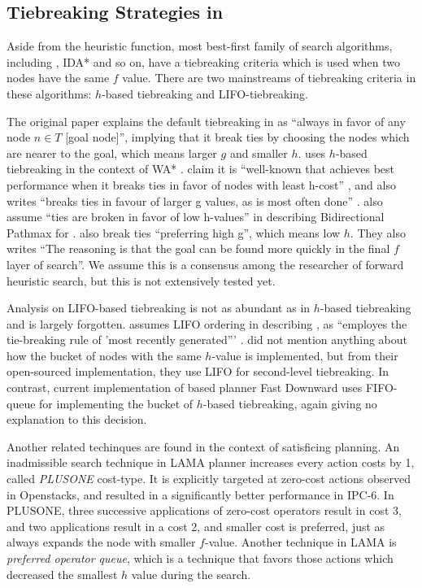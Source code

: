 \subsection{Tiebreaking Strategies in \astar}

Aside from the heuristic function, most best-first family of search
algorithms, including \astar, IDA* and so on, have a tiebreaking criteria which is used
when two nodes have the same $f$ value.
There are two mainstreams of tiebreaking criteria in these algorithms:
$h$-based tiebreaking and LIFO-tiebreaking.

The original \astar paper \cite{hart1968formal} explains the default
tiebreaking in \astar as ``always in favor of any node $n \in T$ [goal
node]'', implying that it break ties by choosing the nodes which are
nearer to the goal, which means larger $g$ and smaller $h$.
\citeauthor{Korf1985depth} uses $h$-based tiebreaking in the context of WA*
\cite{korf1993linear}.  \citeauthor{hansen2007anytime} claim it is
``well-known that \astar achieves best performance when it breaks ties
in favor of nodes with least h-cost'' \cite{hansen2007anytime}, and
\citeauthor{holte2010common} also writes ``\astar breaks ties in favour
of larger g values, as is most often done'' \cite{holte2010common}.
\citeauthor{felner2011inconsistent} also assume ``ties are broken in
favor of low h-values'' in describing Bidirectional Pathmax for \astar.
\citeauthor{burns2012implementing} also break ties ``preferring high
g'', which means low $h$. They also writes ``The reasoning is that the
goal can be found more quickly in the final $f$ layer of search''. We
assume this is a consensus among the researcher of forward heuristic
search, but this is not extensively tested yet.

Analysis on LIFO-based tiebreaking is not as abundant as in $h$-based
tiebreaking and is largely forgotten.
\citeauthor{Korf1985depth} assumes LIFO ordering in describing \astar,
as ``\astar employes the tie-breaking rule of 'most
recently generated''' \cite{Korf1985depth}.
\citeauthor{burns2012implementing} did not mention anything about how
the bucket of nodes with the same $h$-value is implemented, but from their
open-sourced implementation, they use LIFO for second-level tiebreaking. 
In contrast, current implementation of \sota \astar based planner Fast
Downward \cite{Helmert2006} uses FIFO-queue for implementing the bucket
of $h$-based tiebreaking, again giving no explanation to this decision.

Another related techinques are found in the context of satisficing planning.
An inadmissible search technique in LAMA planner \cite{richter2010lama}
increases every action costs by 1, called \emph{PLUSONE} cost-type.
It is explicitly targeted at zero-cost actions observed in Openstacks,
and resulted in a significantly better performance in IPC-6.
In PLUSONE, three successive
applications of zero-cost operators result in cost 3, and two
applications result in a cost 2, and smaller cost is preferred, just as
\astar always expands the node with smaller $f$-value.
Another technique in LAMA is \emph{preferred operator queue},
which is a technique that favors those actions which decreased the
smallest $h$ value during the search.

